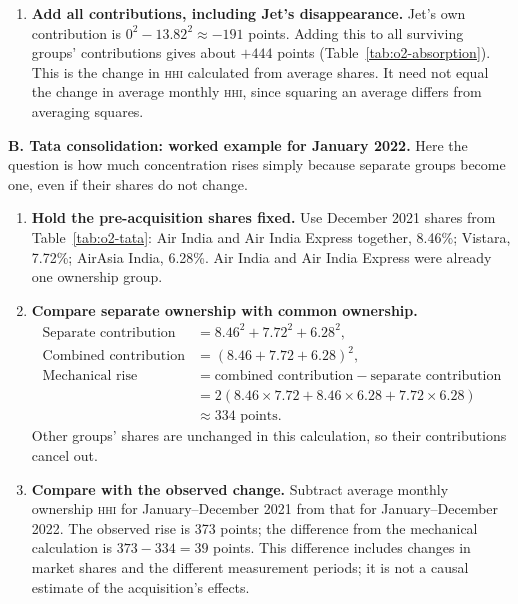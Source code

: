 \documentclass[12pt,a4paper]{article}
\newcommand{\HHI}{\textnormal{\textsc{hhi}}}
\newenvironment{mycontribution}{\par\color{blue}\captionsetup{font+={color=blue}}}{\par}
\begin{document}
\begin{mycontribution}
\begin{enumerate}[leftmargin=2em]
	\item \textbf{Add all contributions, including Jet's disappearance.} Jet's own contribution is $0^2-13.82^2\approx-191$ points. Adding this to all surviving groups' contributions gives about $+444$ points (Table~\ref{tab:o2-absorption}). This is the change in \HHI{} calculated from average shares. It need not equal the change in average monthly \HHI{}, since squaring an average differs from averaging squares.
\end{enumerate}

\textbf{B. Tata consolidation: worked example for January 2022.}
Here the question is how much concentration rises simply because separate groups become one, even if their shares do not change.
\begin{enumerate}[leftmargin=2em]
	\item \textbf{Hold the pre-acquisition shares fixed.} Use December 2021 shares from Table~\ref{tab:o2-tata}: Air India and Air India Express together, 8.46\%; Vistara, 7.72\%; AirAsia India, 6.28\%. Air India and Air India Express were already one ownership group.

	\item \textbf{Compare separate ownership with common ownership.}
	\[
	\begin{aligned}
	\text{Separate contribution} &= 8.46^2+7.72^2+6.28^2,\\
	\text{Combined contribution} &= (8.46+7.72+6.28)^2,\\
	\text{Mechanical rise} &= \text{combined contribution}-\text{separate contribution}\\
	&= 2(8.46\times7.72+8.46\times6.28+7.72\times6.28)\\
	&\approx334\text{ points}.
	\end{aligned}
	\]
	Other groups' shares are unchanged in this calculation, so their contributions cancel out.

	\item \textbf{Compare with the observed change.} Subtract average monthly ownership \HHI{} for January--December 2021 from that for January--December 2022. The observed rise is 373 points; the difference from the mechanical calculation is $373-334=39$ points. This difference includes changes in market shares and the different measurement periods; it is not a causal estimate of the acquisition's effects.
\end{enumerate}


\end{mycontribution}
\end{document}
